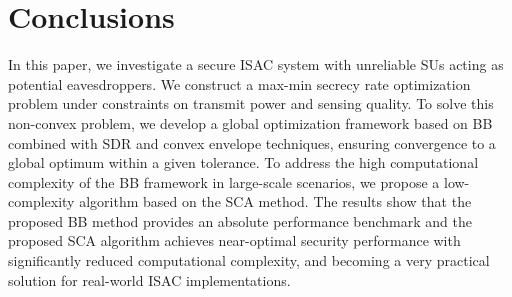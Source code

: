 \documentclass[runningheads]{llncs}
\begin{document}
\section{Conclusions}
In this paper, we investigate a secure ISAC system with unreliable SUs acting as potential eavesdroppers. We construct a max-min secrecy rate optimization problem under constraints on transmit power and sensing quality. To solve this non-convex problem, we develop a global optimization framework based on BB combined with SDR and convex envelope techniques, ensuring convergence to a global optimum within a given tolerance. To address the high computational complexity of the BB framework in large-scale scenarios, we propose a low-complexity algorithm based on the SCA method. The results show that the proposed BB method provides an absolute performance benchmark and the proposed SCA algorithm achieves near-optimal security performance with significantly reduced computational complexity, and becoming a very practical solution for real-world ISAC implementations.
\end{document}
